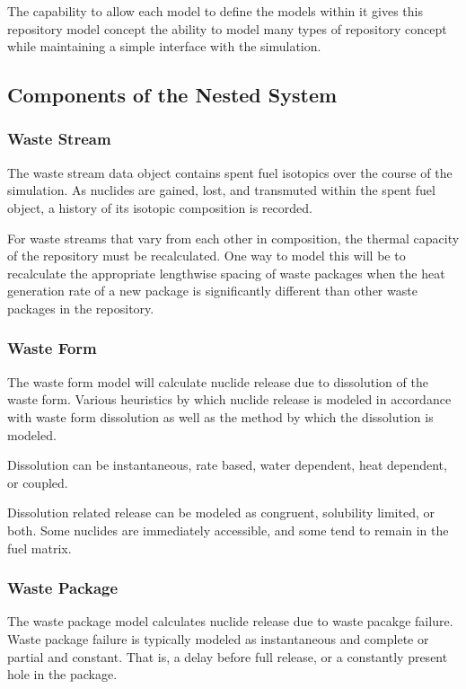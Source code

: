 The capability to allow each model to define the models within it gives this 
repository model concept the ability to model many types of repository concept 
while maintaining a simple interface with the simulation. 

\subsection{Components of the Nested System}

\subsubsection{Waste Stream}

The waste stream data object contains spent fuel isotopics over the 
course of the simulation. As nuclides are gained, lost, and transmuted within 
the spent fuel object, a history of its isotopic composition is recorded.

For waste streams that vary from each other in composition, the thermal capacity 
of the repository must be recalculated. One way to model this will be to 
recalculate the appropriate lengthwise spacing of waste packages when the heat 
generation rate of a new package is significantly different than other waste 
packages in the repository. 

\subsubsection{Waste Form}
The waste form model will calculate nuclide release due to dissolution 
of the waste form. Various heuristics by which nuclide release is modeled in 
accordance with waste form dissolution as well as the method by which 
the dissolution is modeled.

Dissolution can be instantaneous, rate based, water dependent, heat 
dependent, or coupled.

Dissolution related release can be modeled as congruent, solubility 
limited, or both. Some nuclides are immediately accessible, and some 
tend to remain in the fuel matrix. 

\subsubsection{Waste Package}
The waste package model calculates nuclide release due to waste 
pacakge failure. Waste package failure is typically modeled as 
instantaneous and complete or partial and constant. That is, a delay 
before full release, or a constantly present hole in the package.

